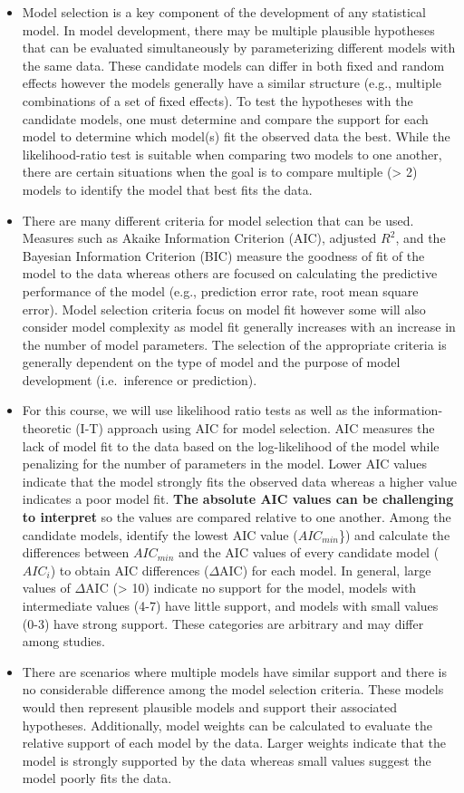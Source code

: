 \documentclass[
  openany]{book}
\begin{document}
\begin{itemize}
\item
  Model selection is a key component of the development of any statistical model. In model development, there may be multiple plausible hypotheses that can be evaluated simultaneously by parameterizing different models with the same data. These candidate models can differ in both fixed and random effects however the models generally have a similar structure (e.g., multiple combinations of a set of fixed effects). To test the hypotheses with the candidate models, one must determine and compare the support for each model to determine which model(s) fit the observed data the best. While the likelihood-ratio test is suitable when comparing two models to one another, there are certain situations when the goal is to compare multiple (\textgreater{} 2) models to identify the model that best fits the data.
\item
  There are many different criteria for model selection that can be used. Measures such as Akaike Information Criterion (AIC), adjusted \(R^2\), and the Bayesian Information Criterion (BIC) measure the goodness of fit of the model to the data whereas others are focused on calculating the predictive performance of the model (e.g., prediction error rate, root mean square error). Model selection criteria focus on model fit however some will also consider model complexity as model fit generally increases with an increase in the number of model parameters. The selection of the appropriate criteria is generally dependent on the type of model and the purpose of model development (i.e.~inference or prediction).
\item
  For this course, we will use likelihood ratio tests as well as the information-theoretic (I-T) approach using AIC for model selection. AIC measures the lack of model fit to the data based on the log-likelihood of the model while penalizing for the number of parameters in the model. Lower AIC values indicate that the model strongly fits the observed data whereas a higher value indicates a poor model fit. \textbf{The absolute AIC values can be challenging to interpret} so the values are compared relative to one another. Among the candidate models, identify the lowest AIC value (\(AIC_{min}\)\}) and calculate the differences between \(AIC_{min}\) and the AIC values of every candidate model (\(AIC_{i}\)) to obtain AIC differences (\(\Delta\)AIC) for each model. In general, large values of \(\Delta\)AIC (\textgreater{} 10) indicate no support for the model, models with intermediate values (4-7) have little support, and models with small values (0-3) have strong support. These categories are arbitrary and may differ among studies.
\item
  There are scenarios where multiple models have similar support and there is no considerable difference among the model selection criteria. These models would then represent plausible models and support their associated hypotheses. Additionally, model weights can be calculated to evaluate the relative support of each model by the data. Larger weights indicate that the model is strongly supported by the data whereas small values suggest the model poorly fits the data.
\end{itemize}
\end{document}
